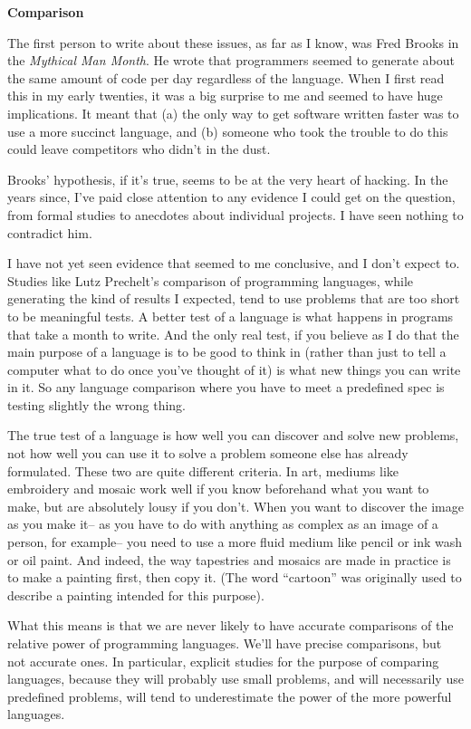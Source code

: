 \documentclass[12pt]{book}
\begin{document}
\textbf{Comparison}

The first person to write about these issues, as far as I know, was Fred
Brooks in the \emph{Mythical Man Month}. He wrote that programmers
seemed to generate about the same amount of code per day regardless of
the language. When I first read this in my early twenties, it was a big
surprise to me and seemed to have huge implications. It meant that (a)
the only way to get software written faster was to use a more succinct
language, and (b) someone who took the trouble to do this could leave
competitors who didn't in the dust.

Brooks' hypothesis, if it's true, seems to be at the very heart of
hacking. In the years since, I've paid close attention to any evidence I
could get on the question, from formal studies to anecdotes about
individual projects. I have seen nothing to contradict him.

I have not yet seen evidence that seemed to me conclusive, and I don't
expect to. Studies like Lutz Prechelt's comparison of programming
languages, while generating the kind of results I expected, tend to use
problems that are too short to be meaningful tests. A better test of a
language is what happens in programs that take a month to write. And the
only real test, if you believe as I do that the main purpose of a
language is to be good to think in (rather than just to tell a computer
what to do once you've thought of it) is what new things you can write
in it. So any language comparison where you have to meet a predefined
spec is testing slightly the wrong thing.

The true test of a language is how well you can discover and solve new
problems, not how well you can use it to solve a problem someone else
has already formulated. These two are quite different criteria. In art,
mediums like embroidery and mosaic work well if you know beforehand what
you want to make, but are absolutely lousy if you don't. When you want
to discover the image as you make it-- as you have to do with anything
as complex as an image of a person, for example-- you need to use a more
fluid medium like pencil or ink wash or oil paint. And indeed, the way
tapestries and mosaics are made in practice is to make a painting first,
then copy it. (The word ``cartoon'' was originally used to describe a
painting intended for this purpose).

What this means is that we are never likely to have accurate comparisons
of the relative power of programming languages. We'll have precise
comparisons, but not accurate ones. In particular, explicit studies for
the purpose of comparing languages, because they will probably use small
problems, and will necessarily use predefined problems, will tend to
underestimate the power of the more powerful languages.
\end{document}
